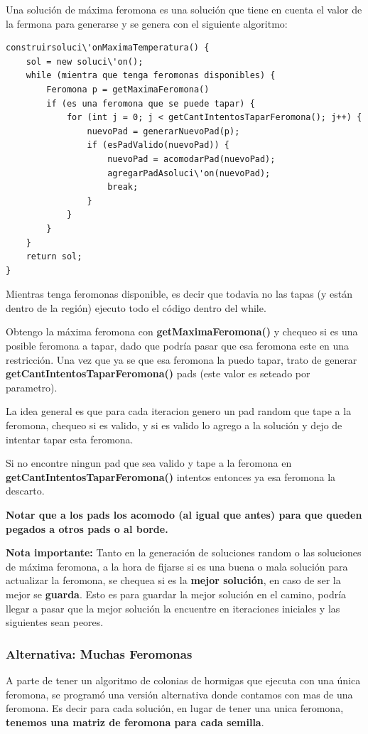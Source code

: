 Una soluci\'on de m\'axima feromona es una soluci\'on que tiene en cuenta el valor de la fermona para generarse y se genera con el siguiente algoritmo:


\begin{verbatim}
construirsoluci\'onMaximaTemperatura() {
    sol = new soluci\'on();
    while (mientra que tenga feromonas disponibles) {
        Feromona p = getMaximaFeromona()
        if (es una feromona que se puede tapar) {
            for (int j = 0; j < getCantIntentosTaparFeromona(); j++) {
                nuevoPad = generarNuevoPad(p);
                if (esPadValido(nuevoPad)) {
                    nuevoPad = acomodarPad(nuevoPad);
                    agregarPadAsoluci\'on(nuevoPad);
                    break;
                }
            }
        }
    }
    return sol;
}
\end{verbatim}

Mientras tenga feromonas disponible, es decir que todavia no las tapas (y est\'an dentro de la regi\'on) ejecuto todo el c\'odigo dentro del while. 

Obtengo la m\'axima feromona con \textbf{getMaximaFeromona()} y chequeo si es una posible feromona a tapar, dado que podr\'ia pasar que esa feromona este en una restricci\'on. 
Una vez que ya se que esa feromona la puedo tapar, trato de generar \textbf{getCantIntentosTaparFeromona()} pads (este valor es seteado por parametro). 

La idea general es que para cada iteracion genero un pad random que tape a la feromona, chequeo si es valido, y si es valido lo agrego a la soluci\'on y dejo de intentar tapar esta feromona.

Si no encontre ningun pad que sea valido y tape a la feromona en \textbf{getCantIntentosTaparFeromona()} intentos entonces ya esa feromona la descarto. 

\textbf{Notar que a los pads los acomodo (al igual que antes) para que queden pegados a otros pads o al borde.}

\textbf{Nota importante:} Tanto en la generaci\'on de soluciones random o las soluciones de m\'axima feromona, a la hora de fijarse si es una buena o mala soluci\'on para actualizar la feromona, se chequea si es la \textbf{mejor soluci\'on}, en caso de ser la mejor se \textbf{guarda}. Esto es para guardar la mejor soluci\'on en el camino, podr\'ia llegar a pasar que la mejor soluci\'on la encuentre en iteraciones iniciales y las siguientes sean peores.


\subsubsection{Alternativa: Muchas Feromonas}
A parte de tener un algoritmo de colonias de hormigas que ejecuta con una \'unica feromona, se program\'o una versi\'on alternativa donde contamos con mas de una feromona. Es decir para cada soluci\'on, en lugar de tener una unica feromona, \textbf{tenemos una matriz de feromona para cada semilla}.
 
